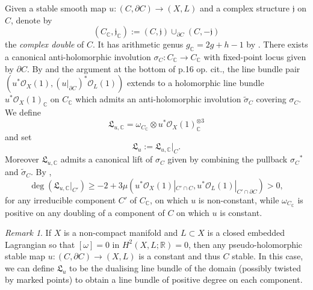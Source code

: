\documentclass[11pt,psamsfonts, oneside, reqno]{amsart}
\newcommand{\sub}{\subset}%
\newcommand{\cl}{\colon}
\newcommand{\del}{\partial}
\newcommand{\bC}{\mathbb{C}}
\newcommand{\bR}{\mathbb{R}}
\newcommand{\cO}{\mathcal{O}}
\newcommand{\fL}{\mathfrak{L}}
\newcommand{\fj}{\mathfrak{j}}
\newcommand{\wt}{\widetilde}
\theoremstyle{definition}
\theoremstyle{remark}
\newtheorem{remark}[theorem]{Remark}
\numberwithin{equation}{section}
\begin{document}
 \noindent 
Given a stable smooth map $u \cl (C,\del C)\to (X,L)$ and a complex structure $\fj$ on $C$, denote by 
$$(C_\bC,\fj_\bC) := (C,\fj)\cup_{\del C}(C,-\fj)$$\noindent
 the \emph{complex double} of $C$. It has arithmetic genus $g_{\bC} = 2g + h-1$ by \cite[]{KL06}. There exists a canonical anti-holomorphic involution $\sigma_C \cl C_\bC\to C_\bC$ with fixed-point locus given by $\del C$. By \cite[Theorem 3.3.13]{KL06} and the argument at the bottom of p.16 op. cit., the line bundle pair $(u^*\cO_X(1),(u|_{\del C})^*\cO_L(1))$ extends to a holomorphic line bundle $u^*\cO_X(1)_\bC$ on $C_\bC$ which admits an anti-holomorphic involution $\wt\sigma_C$ covering $\sigma_C$. We define
\begin{equation*}\label{eq:complex-polarisation}
	\fL_{u,\bC} = \omega_{C_\bC}\otimes u^*\cO_X(1)_\bC^{\otimes 3}
\end{equation*}
and set 
\begin{equation}\label{eq:real-line-bundle}\fL_u := \fL_{u,\bC}|_{C}. \end{equation} 
Moreover $\fL_{u,\bC}$ admits a canonical lift of $\sigma_C$ given by combining the pullback ${\sigma_C}^*$ and $\wt\sigma_C$.
By \cite{KL06},
$$\deg(\fL_{u,\bC}|_{C'}) \geq -2 + 3\mu(u^*\cO_X(1)|_{C'\cap C},u^*\cO_L(1)|_{C'\cap \del C}) > 0,$$\noindent
for any irreducible component $C'$ of $C_\bC$, on which $u$ is non-constant, while $\omega_{C_\bC}$ is positive on any doubling of a component of $C$ on which $u$ is constant. 

\begin{remark}\label{de:if-only-constant-curves} If $X$ is a non-compact manifold and $L \sub X$ is a closed embedded Lagrangian so that $[\omega] = 0$ in $H^2(X,L;\bR) = 0$, then any pseudo-holomorphic stable map $u \cl (C,\del C)\to (X,L)$ is a constant and thus $C$ stable. In this case, we can define $\fL_u$ to be the dualising line bundle of the domain (possibly twisted by marked points) to obtain a line bundle of positive degree on each component.\end{remark}
\end{document}
